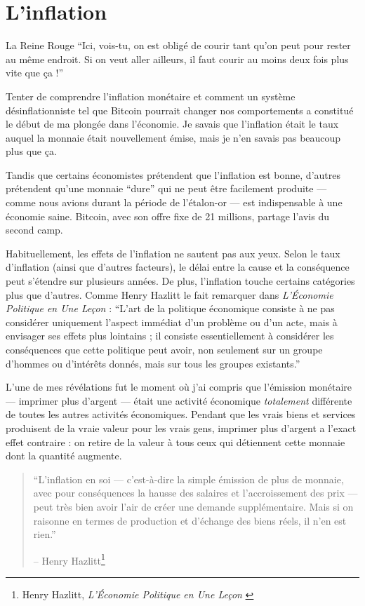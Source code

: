 \chapter{L'inflation}
\label{les:9}

\begin{chapquote}{La Reine Rouge} 
\enquote{Ici, vois-tu, on est obligé de courir tant qu'on peut pour rester au
même endroit. Si on veut aller ailleurs, il faut courir au moins deux fois plus
vite que ça !}
\end{chapquote}

Tenter de comprendre l'inflation monétaire et comment un système
désinflationniste tel que Bitcoin pourrait changer nos comportements a constitué
le début de ma plongée dans l'économie. Je savais que l'inflation était le taux
auquel la monnaie était nouvellement émise, mais je n'en savais pas beaucoup
plus que ça.

Tandis que certains économistes prétendent que l'inflation est bonne, d'autres
prétendent qu'une monnaie \enquote{dure} qui ne peut être facilement produite
--- comme nous avions durant la période de l'étalon-or --- est indispensable à
une économie saine. Bitcoin, avec son offre fixe de 21 millions, partage l'avis
du second camp.

Habituellement, les effets de l'inflation ne sautent pas aux yeux. Selon le taux
d'inflation (ainsi que d'autres facteurs), le délai entre la cause et la
conséquence peut s'étendre sur plusieurs années. De plus, l'inflation touche
certains catégories plus que d'autres. Comme Henry Hazlitt le fait remarquer
dans \textit{L'Économie Politique en Une Leçon} : \enquote{L'art de la politique
économique consiste à ne pas considérer uniquement l'aspect immédiat d'un
problème ou d'un acte, mais à envisager ses effets plus lointains ; il consiste
essentiellement à considérer les conséquences que cette politique peut avoir,
non seulement sur un groupe d'hommes ou d'intérêts donnés, mais sur tous les
groupes existants.}

L'une de mes révélations fut le moment où j'ai compris que l'émission monétaire
--- imprimer plus d'argent --- était une activité économique \textit{totalement}
différente de toutes les autres activités économiques. Pendant que les vrais
biens et services produisent de la vraie valeur pour les vrais gens, imprimer
plus d'argent a l'exact effet contraire : on retire de la valeur à tous ceux
qui détiennent cette monnaie dont la quantité augmente.

\begin{quotation}\begin{samepage}
\enquote{L'inflation en soi --- c'est-à-dire la simple émission de plus de
monnaie, avec pour conséquences la hausse des salaires et l'accroissement des
prix --- peut très bien avoir l'air de créer une demande supplémentaire. Mais si
on raisonne en termes de production et d'échange des biens réels, il n'en est
rien.}
\begin{flushright} -- Henry Hazlitt\footnote{Henry Hazlitt, \textit{L'Économie
Politique en Une Leçon} \cite{hazlitt}}
\end{flushright}\end{samepage}\end{quotation}

